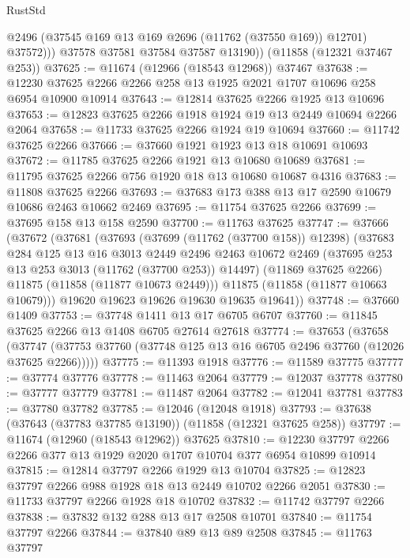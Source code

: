 \begin{lexlean}{RustStd}
\begin{coremodule}
              @2496
              (@37545 @169 @13 @169 @2696 (@11762 (@37550 @169)) @12701)
              @37572)))
        @37578
        @37581
        @37584
        @37587
        @13190))
    (@11858 (@12321 @37467 @253))
@37625 := @11674 (@12966 (@18543 @12968)) @37467
@37638 := @12230 @37625 @2266 @2266 @258 @13 @1925 @2021 @1707 @10696 @258 @6954 @10900 @10914
@37643 := @12814 @37625 @2266 @1925 @13 @10696
@37653 := @12823 @37625 @2266 @1918 @1924 @19 @13 @2449 @10694 @2266 @2064
@37658 := @11733 @37625 @2266 @1924 @19 @10694
@37660 := @11742 @37625 @2266
@37666 := @37660 @1921 @1923 @13 @18 @10691 @10693
@37672 := @11785 @37625 @2266 @1921 @13 @10680 @10689
@37681 := @11795 @37625 @2266 @756 @1920 @18 @13 @10680 @10687 @4316
@37683 := @11808 @37625 @2266
@37693 := @37683 @173 @388 @13 @17 @2590 @10679 @10686 @2463 @10662 @2469
@37695 := @11754 @37625 @2266
@37699 := @37695 @158 @13 @158 @2590
@37700 := @11763 @37625
@37747 := @37666
    (@37672
      (@37681
        (@37693
          (@37699 (@11762 (@37700 @158)) @12398)
          (@37683
            @284
            @125
            @13
            @16
            @3013
            @2449
            @2496
            @2463
            @10672
            @2469
            (@37695 @253 @13 @253 @3013 (@11762 (@37700 @253)) @14497)
            (@11869 @37625 @2266)
            @11875
            (@11858 (@11877 @10673 @2449)))
          @11875
          (@11858 (@11877 @10663 @10679)))
        @19620
        @19623
        @19626
        @19630
        @19635
        @19641))
@37748 := @37660 @1409
@37753 := @37748 @1411 @13 @17 @6705 @6707
@37760 := @11845 @37625 @2266 @13 @1408 @6705 @27614 @27618
@37774 := @37653
    (@37658 (@37747 (@37753 @37760 (@37748 @125 @13 @16 @6705 @2496 @37760 (@12026 @37625 @2266)))))
@37775 := @11393 @1918
@37776 := @11589 @37775
@37777 := @37774 @37776
@37778 := @11463 @2064
@37779 := @12037 @37778
@37780 := @37777 @37779
@37781 := @11487 @2064
@37782 := @12041 @37781
@37783 := @37780 @37782
@37785 := @12046 (@12048 @1918)
@37793 := @37638 (@37643 (@37783 @37785 @13190)) (@11858 (@12321 @37625 @258))
@37797 := @11674 (@12960 (@18543 @12962)) @37625
@37810 := @12230 @37797 @2266 @2266 @377 @13 @1929 @2020 @1707 @10704 @377 @6954 @10899 @10914
@37815 := @12814 @37797 @2266 @1929 @13 @10704
@37825 := @12823 @37797 @2266 @988 @1928 @18 @13 @2449 @10702 @2266 @2051
@37830 := @11733 @37797 @2266 @1928 @18 @10702
@37832 := @11742 @37797 @2266
@37838 := @37832 @132 @288 @13 @17 @2508 @10701
@37840 := @11754 @37797 @2266
@37844 := @37840 @89 @13 @89 @2508
@37845 := @11763 @37797

\end{coremodule}
\end{lexlean}
